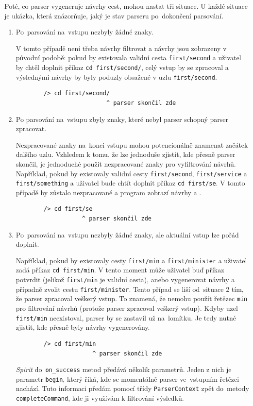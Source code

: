\documentclass[thesis=B,czech,hidelinks]{FITthesis}[2019/03/06]
\begin{document}
Poté, co parser vygeneruje návrhy cest, mohou nastat tři situace. U každé situace je ukázka, která znázorňuje, jaký je stav parseru po~dokončení parsování.
\begin{enumerate}
    \item Po~parsování na~vstupu nezbyly žádné znaky.

        V tomto případě není třeba návrhy filtrovat a návrhy jsou zobrazeny v původní podobě: pokud by existovala validní cesta \texttt{first/second} a uživatel by chtěl doplnit příkaz \texttt{cd first/second/}, celý vstup by se zpracoval a výslednými návrhy by byly poduzly obsažené v uzlu \texttt{first/second}.
        \begin{verbatim}
        /> cd first/second/
                          ^ parser skončil zde
        \end{verbatim}
    \item Po parsování na~vstupu zbyly znaky, které nebyl parser schopný parser zpracovat.

        Nezpracované znaky na~konci vstupu mohou potencionálně znamenat začátek dalšího uzlu. Vzhledem k tomu, že lze jednoduše zjistit, kde přesně parser skončil, je jednoduché použít nezpracované znaky pro vyfiltrování návrhů. Například, pokud by existovaly validní cesty \texttt{first/second}, \texttt{first/service} a \texttt{first/something} a uživatel bude chtít doplnit příkaz \texttt{cd first/se}. V tomto případě by  zůstalo nezpracované a program zobrazí návrhy  a .
        \begin{verbatim}
        /> cd first/se
                   ^ parser skončil zde
        \end{verbatim}
    \item Po~parsování na~vstupu nezbyly žádné znaky, ale aktuální vstup lze pořád doplnit.

        Například, pokud by existovaly cesty \texttt{first/min} a \texttt{first/minister} a uživatel zadá příkaz \texttt{cd first/min}. V tento moment může uživatel buď příkaz potvrdit (jelikož \texttt{first/min} je validní cesta), anebo vygenerovat návrhy a případně zvolit cestu \texttt{first/minister}. Tento případ se liší od~situace 2 tím, že parser zpracoval veškerý vstup. To znamená, že nemohu použít řetězec \texttt{min} pro filtrování návrhů (protože parser zpracoval veškerý vstup). Kdyby uzel \texttt{first/min} neexistoval, parser by se zastavil už na~lomítku. Je tedy nutné zjistit, kde přesně byly návrhy vygenerovány.
        \begin{verbatim}
        /> cd first/min
                      ^ parser skončil zde
        \end{verbatim}

        \textit{Spirit} do~\texttt{on\_success} metod předává několik parametrů. Jeden z nich je parametr \texttt{begin}, který říká, kde se momentálně parser ve~vstupním řetězci nachází. Tuto informaci předám pomocí třídy \texttt{ParserContext} zpět do~metody \texttt{completeCommand}, kde ji využívám k filtrování výsledků.
\end{enumerate}
\end{document}

